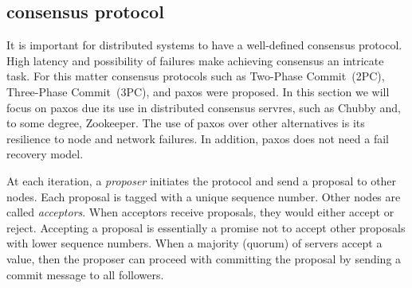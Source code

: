 \subsection{consensus protocol}
It is important for distributed systems to have a well-defined consensus protocol. High latency and possibility of failures make achieving consensus an intricate task. For this matter consensus protocols such as Two-Phase Commit~(2PC), Three-Phase Commit~(3PC), and paxos were proposed. In this section we will focus on paxos due its use in distributed consensus servres, such as Chubby and, to some degree, Zookeeper. The use of paxos over other alternatives is its resilience to node and network failures. In addition, paxos does not need a fail recovery model.

At each iteration, a \emph{proposer} initiates the protocol and send a proposal to other nodes. Each proposal is tagged with a unique sequence number. Other nodes are called \emph{acceptors}. When acceptors receive proposals, they would either accept or reject. Accepting a proposal is essentially a promise not to accept other proposals with lower sequence numbers. When a majority (quorum) of servers accept a value, then the proposer can proceed with committing the proposal by sending a commit message to all followers. 

